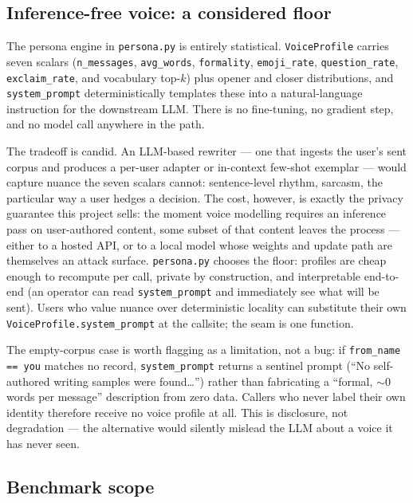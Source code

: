 \subsection{Inference-free voice: a considered floor}
\label{sec:limit-persona}

The persona engine in \texttt{persona.py} is entirely statistical. \texttt{VoiceProfile} carries seven scalars (\texttt{n\_messages}, \texttt{avg\_words}, \texttt{formality}, \texttt{emoji\_rate}, \texttt{question\_rate}, \texttt{exclaim\_rate}, and vocabulary top-$k$) plus opener and closer distributions, and \texttt{system\_prompt} deterministically templates these into a natural-language instruction for the downstream LLM. There is no fine-tuning, no gradient step, and no model call anywhere in the path.

The tradeoff is candid. An LLM-based rewriter --- one that ingests the user's sent corpus and produces a per-user adapter or in-context few-shot exemplar --- would capture nuance the seven scalars cannot: sentence-level rhythm, sarcasm, the particular way a user hedges a decision. The cost, however, is exactly the privacy guarantee this project sells: the moment voice modelling requires an inference pass on user-authored content, some subset of that content leaves the process --- either to a hosted API, or to a local model whose weights and update path are themselves an attack surface. \texttt{persona.py} chooses the floor: profiles are cheap enough to recompute per call, private by construction, and interpretable end-to-end (an operator can read \texttt{system\_prompt} and immediately see what will be sent). Users who value nuance over deterministic locality can substitute their own \texttt{VoiceProfile.system\_prompt} at the callsite; the seam is one function.

The empty-corpus case is worth flagging as a limitation, not a bug: if \texttt{from\_name == you} matches no record, \texttt{system\_prompt} returns a sentinel prompt (``No self-authored writing samples were found\ldots'') rather than fabricating a ``formal, $\sim 0$ words per message'' description from zero data. Callers who never label their own identity therefore receive no voice profile at all. This is disclosure, not degradation --- the alternative would silently mislead the LLM about a voice it has never seen.

\subsection{Benchmark scope}
\label{sec:limit-bench}

